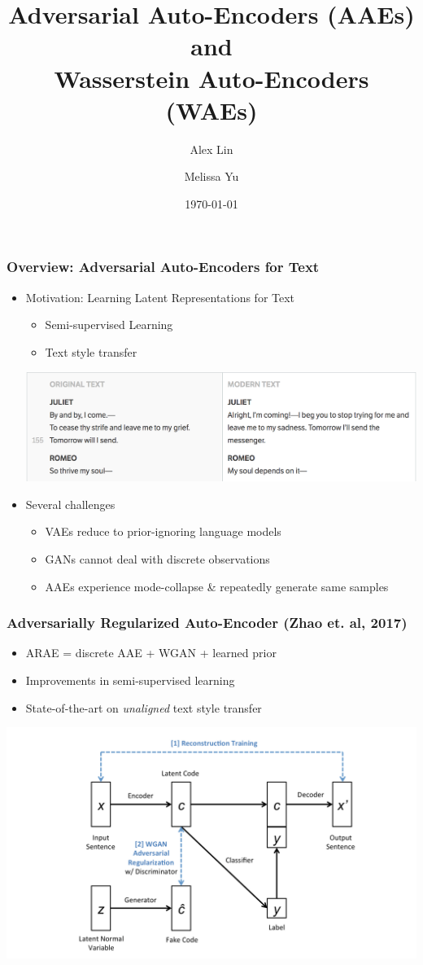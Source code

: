 \documentclass{beamer}
\title[AAEs for Text]{Adversarial Auto-Encoders (AAEs) and \\ Wasserstein Auto-Encoders (WAEs)}
\author[A. Lin \and M. Yu]{Alex Lin \and Melissa Yu}
\institute[Harvard University]{Harvard University}
\date{\today}
\begin{document}
\begin{frame}
\frametitle{Overview: Adversarial Auto-Encoders for Text} 
\begin{itemize}
\item Motivation: Learning Latent Representations for Text
\begin{itemize}
\item Semi-supervised Learning
\item Text style transfer
\end{itemize}

\begin{center}
\includegraphics[scale=0.4]{shakespeare}
\end{center}

\item Several challenges
\begin{itemize}
\item VAEs reduce to prior-ignoring language models
\item GANs cannot deal with discrete observations
\item AAEs experience mode-collapse \& repeatedly generate same samples
\end{itemize}
\end{itemize}
\end{frame}

\begin{frame}
\frametitle{Adversarially Regularized Auto-Encoder (Zhao et. al, 2017)} 
\begin{itemize}
\item ARAE = discrete AAE + WGAN + learned prior
\item Improvements in semi-supervised learning
\item State-of-the-art on \emph{unaligned} text style transfer 
\end{itemize}
\begin{center}
\includegraphics[scale=0.15]{arae}
\end{center}
\end{frame}
\end{document}

